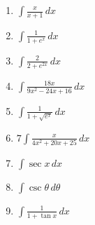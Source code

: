 \documentclass[../main.tex]{subfiles}
\begin{document}
\begin{enumerate}
    \item \(\int \frac{x}{x+1}\,dx\)

    \item \(\int \frac{1}{1+e^x}\,dx\)
    
    \item \(\int \frac{2}{2 + e^{2x}}\,dx\)
    
    \item \(\int \frac{18x}{9x^2 -24x + 16}\,dx\)
    
    \item \(\int \frac{1}{1+\sqrt{e^x}}\,dx\)
    
    \item \(7\int \frac{x}{4x^2+20x+25}\,dx\)
    
    \item \(\int \sec{x}\,dx\)
    
    \item \(\int \csc{\theta}\,d\theta\)
    
    \item $\int \frac{1}{1+\tan{x}}\,dx$

\end{enumerate}
\end{document}
